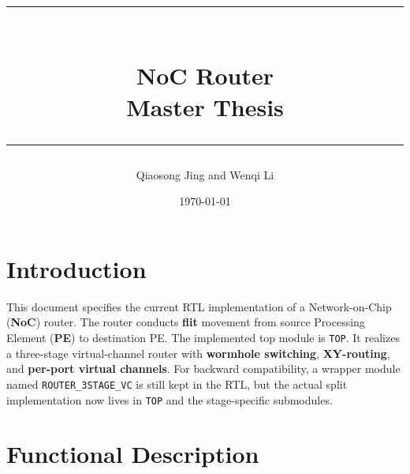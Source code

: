 \documentclass[11pt,a4paper]{article}
\title{
    \rule{\linewidth}{0.5mm} \\
    \textbf{NoC Router} \\
    \large Master Thesis \\
    \rule{\linewidth}{0.5mm}
}
\author{Qiaosong Jing and Wenqi Li}
\date{\today}
\begin{document}
\maketitle
\tableofcontents
\newpage

\section{Introduction}
This document specifies the current RTL implementation of a Network-on-Chip (\textbf{NoC}) router. The router conducts \textbf{flit} movement from source Processing Element (\textbf{PE}) to destination PE. The implemented top module is \texttt{TOP}. It realizes a three-stage virtual-channel router with \textbf{wormhole switching}, \textbf{XY-routing}, and \textbf{per-port virtual channels}. For backward compatibility, a wrapper module named \texttt{ROUTER\_3STAGE\_VC} is still kept in the RTL, but the actual split implementation now lives in \texttt{TOP} and the stage-specific submodules.

\section{Functional Description}
\end{document}
